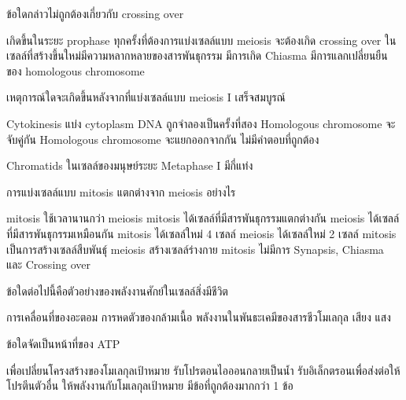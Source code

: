 \begin{questions}
\filbreak
  \question ข้อใดกล่าวไม่ถูกต้องเกี่ยวกับ crossing over
  \begin{choices}
    \choice เกิดขึ้นในระยะ prophase
    \choice ทุกครั้งที่ต้องการแบ่งเซลล์แบบ meiosis จะต้องเกิด crossing over
    \choice ในเซลล์ที่สร้างขึ้นใหม่มีความหลากหลายของสารพันธุกรรม
    \choice มีการเกิด Chiasma
    \choice มีการแลกเปลี่ยนยืนของ homologous chromosome
\end{choices}

\newpage


\filbreak
  \question เหตุการณ์ใดจะเกิดขึ้นหลังจากที่แบ่งเซลล์แบบ meiosis I เสร็จสมบูรณ์
  \begin{choices}
    \choice Cytokinesis แบ่ง cytoplasm
    \choice DNA ถูกจำลองเป็นครั้งที่สอง
    \choice Homologous chromosome จะจับคู่กัน
    \choice Homologous chromosome จะแยกออกจากกัน
    \choice ไม่มีคำตอบที่ถูกต้อง
\end{choices}

\filbreak
  \question Chromatids ในเซลล์ของมนุษย์ระยะ Metaphase I มีกี่แท่ง
  \begin{choices}
\end{choices}

\filbreak
  \question การแบ่งเซลล์แบบ mitosis แตกต่างจาก meiosis อย่างไร
  \begin{choices}
    \choice mitosis ใช้เวลานานกว่า meiosis
    \choice mitosis ได้เซลล์ที่มีสารพันธุกรรมแตกต่างกัน meiosis ได้เซลล์ที่มีสารพันธุกรรมเหมือนกัน
    \choice mitosis ได้เซลล์ใหม่ 4 เซลล์ meiosis ได้เซลล์ใหม่ 2 เซลล์
    \choice mitosis เป็นการสร้างเซลล์สืบพันธุ์ meiosis สร้างเซลล์ร่างกาย
    \choice mitosis ไม่มีการ Synapsis, Chiasma และ Crossing over
\end{choices}

\filbreak
  \question ข้อใดต่อไปนี้คือตัวอย่างของพลังงานศักย์ในเซลล์สิ่งมีชีวิต
  \begin{choices}
    \choice การเคลื่อนที่ของอะตอม
    \choice การหดตัวของกล้ามเนื้อ
    \choice พลังงานในพันธะเคมีของสารชีวโมเลกุล
    \choice เสียง
    \choice แสง
\end{choices}

\filbreak
  \question ข้อใดจัดเป็นหน้าที่ของ ATP
  \begin{choices}
    \choice เพื่อเปลี่ยนโครงสร้างของโมเลกุลเป้าหมาย
    \choice รับโปรตอนไอออนกลายเป็นน้ำ
    \choice รับอิเล็กตรอนเพื่อส่งต่อให้โปรตีนตัวอื่น
    \choice ให้พลังงานกับโมเลกุลเป้าหมาย
    \choice มีข้อที่ถูกต้องมากกว่า 1 ข้อ
\end{choices}


\end{questions}
